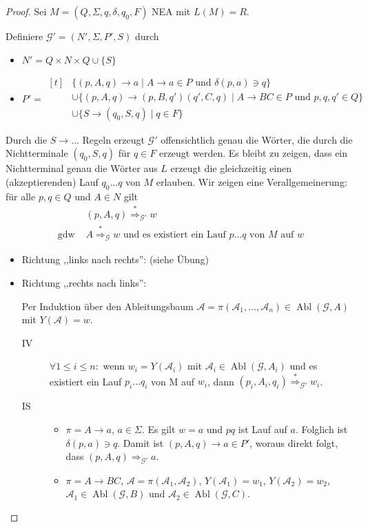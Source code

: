 {\begin{proof}
  Sei $M = (Q, \Sigma, q, \delta, q_0, F)$ NEA mit $L(M) = R$.

  Definiere $\mathcal{G}' = (N', \Sigma, P', S)$ durch
  \begin{itemize}
  \item[] $N' = Q \times N \times Q \cup \{S\}$
  \item[] $P' =
    \begin{aligned}[t]
      &\{ (p, A, q) \to a \mid A \to a \in P \text{ und } \delta(p,a) \ni q \} \\
      &\cup \{ (p, A, q) \to (p,B,q')(q',C,q) \mid A \to BC \in P \text{ und } p,q,q' \in Q\} \\
      &\cup \{ S \to (q_0, S, q) \mid q \in F \}
    \end{aligned}
    $
  \end{itemize}
  Durch die $S \to \ldots$ Regeln erzeugt $\mathcal{G}'$ offensichtlich genau die Wörter, die durch die Nichtterminale $(q_0, S, q)$ für $q \in F$ erzeugt werden.
  Es bleibt zu zeigen, dass ein Nichtterminal genau die Wörter aus $L$ erzeugt die gleichzeitig einen (akzeptierenden) Lauf $q_0\ldots q$ von $M$ erlauben.
  Wir zeigen eine Verallgemeinerung: für alle $p,q \in Q$ und $A \in N$ gilt
  \begin{align*}
    &(p,A,q) \stackrel{*}{\Longrightarrow}_{\mathcal{G}'} w \\
    \text{ gdw } & A \stackrel{*}{\Longrightarrow}_{\mathcal{G}} w \text{ und es existiert ein Lauf } p\ldots q \text{ von $M$ auf $w$}
  \end{align*}
  \begin{itemize}
  \item Richtung ,,links nach rechts'': (siehe Übung)
  \item Richtung ,,rechts nach links'':

    Per Induktion über den Ableitungsbaum $\mathcal{A} = \pi(\mathcal{A}_1,\ldots,\mathcal{A}_n) \in \operatorname{Abl}(\mathcal{G}, A)$ mit $Y(\mathcal{A}) = w$.
    \begin{description}
      \item[IV] $\forall 1 \le i \le n:$ wenn $w_i = Y(\mathcal{A}_i)$ mit $\mathcal{A}_i \in \operatorname{Abl}(\mathcal{G}, A_i)$ und es existiert ein Lauf  $p_i\ldots q_i$  von M auf $w_i$, dann $(p_i, A_i, q_i) \stackrel{*}{\Longrightarrow}_{\mathcal{G}'} w_i$.
      \item[IS] \hfill
        \begin{itemize}
        \item $\pi = A \to a$, $a \in \Sigma$.
          Es gilt $w = a$ und $pq$ ist Lauf auf $a$.
          Folglich ist $\delta(p, a) \ni q$. Damit ist $(p,A,q) \to a \in P'$, woraus direkt folgt, dass $(p,A,q) \Longrightarrow_{\mathcal{G}'} a$.
        \item $\pi = A \to BC$, $\mathcal{A} = \pi(\mathcal{A}_1, \mathcal{A}_2)$, $Y(\mathcal{A}_1) = w_1$, $Y(\mathcal{A}_2) = w_2$, \mbox{$\mathcal{A}_1 \in \operatorname{Abl}(\mathcal{G}, B)$} und $\mathcal{A}_2 \in \operatorname{Abl}(\mathcal{G}, C)$.


\end{itemize}
\end{description}
\end{itemize}
\end{proof}}
